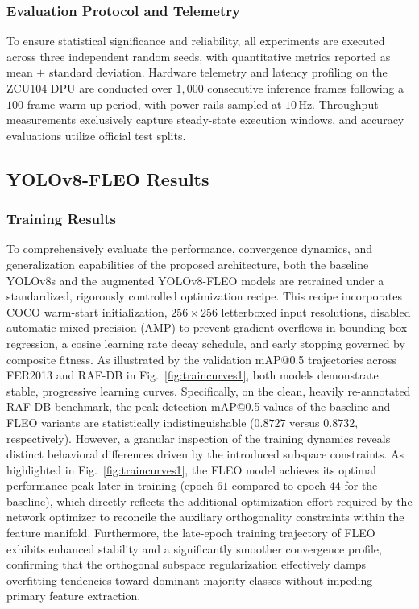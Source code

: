 \documentclass[algorithms,article,submit,moreauthors]{Definitions/mdpi}
\begin{document}
\subsubsection{Evaluation Protocol and Telemetry}

To ensure statistical significance and reliability, all experiments are executed across three independent random seeds, with quantitative metrics reported as mean $\pm$ standard deviation. Hardware telemetry and latency profiling on the ZCU104 DPU are conducted over $1{,}000$ consecutive inference frames following a $100$-frame warm-up period, with power rails sampled at $10\,$Hz. Throughput measurements exclusively capture steady-state execution windows, and accuracy evaluations utilize official test splits.

\subsection{YOLOv8-FLEO Results}
\label{sec:yolov8_fleo_results}
\subsubsection{Training Results}

To comprehensively evaluate the performance, convergence dynamics, and generalization capabilities of the proposed architecture, both the baseline YOLOv8s and the augmented YOLOv8-FLEO models are retrained under a standardized, rigorously controlled optimization recipe. This recipe incorporates COCO warm-start initialization, $256\times256$ letterboxed input resolutions, disabled automatic mixed precision (AMP) to prevent gradient overflows in bounding-box regression, a cosine learning rate decay schedule, and early stopping governed by composite fitness. As illustrated by the validation mAP@0.5 trajectories across FER2013 and RAF-DB in Fig.~\ref{fig:traincurves1}, both models demonstrate stable, progressive learning curves. Specifically, on the clean, heavily re-annotated RAF-DB benchmark, the peak detection mAP@0.5 values of the baseline and FLEO variants are statistically indistinguishable ($0.8727$ versus $0.8732$, respectively). However, a granular inspection of the training dynamics reveals distinct behavioral differences driven by the introduced subspace constraints. As highlighted in Fig.~\ref{fig:traincurves1}, the FLEO model achieves its optimal performance peak later in training (epoch $61$ compared to epoch $44$ for the baseline), which directly reflects the additional optimization effort required by the network optimizer to reconcile the auxiliary orthogonality constraints within the feature manifold. Furthermore, the late-epoch training trajectory of FLEO exhibits enhanced stability and a significantly smoother convergence profile, confirming that the orthogonal subspace regularization effectively damps overfitting tendencies toward dominant majority classes without impeding primary feature extraction.
\end{document}
